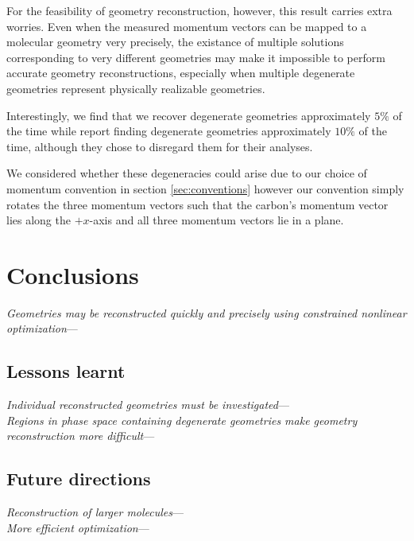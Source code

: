 For the feasibility of geometry reconstruction, however, this result carries extra worries. Even when the measured momentum vectors can be mapped to a molecular geometry very precisely, the existance of multiple solutions corresponding to very different geometries may make it impossible to perform accurate geometry reconstructions, especially when multiple degenerate geometries represent physically realizable geometries.

Interestingly, we find that we recover degenerate geometries approximately $5\%$ of the time while \citet[supplementary information]{Kunitski15} report finding degenerate geometries approximately $10\%$ of the time, although they chose to disregard them for their analyses.

We considered whether these degeneracies could arise due to our choice of momentum convention in section \ref{sec:conventions} however our convention simply rotates the three momentum vectors such that the carbon's momentum vector lies along the $+x$-axis and all three momentum vectors lie in a plane.

\section{Conclusions}
\emph{Geometries may be reconstructed quickly and precisely using constrained nonlinear optimization}---

\subsection{Lessons learnt}
\emph{Individual reconstructed geometries must be investigated}--- \\

\noindent
\emph{Regions in phase space containing degenerate geometries make geometry reconstruction more difficult}---

\subsection{Future directions}
\emph{Reconstruction of larger molecules}--- \\

\noindent
\emph{More efficient optimization}---